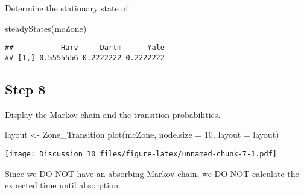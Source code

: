 \documentclass[
]{article}
\newenvironment{Shaded}{\begin{snugshade}}{\end{snugshade}}
\newcommand{\AttributeTok}[1]{\textcolor[rgb]{0.77,0.63,0.00}{#1}}
\newcommand{\DecValTok}[1]{\textcolor[rgb]{0.00,0.00,0.81}{#1}}
\newcommand{\FunctionTok}[1]{\textcolor[rgb]{0.00,0.00,0.00}{#1}}
\newcommand{\NormalTok}[1]{#1}
\newcommand{\OtherTok}[1]{\textcolor[rgb]{0.56,0.35,0.01}{#1}}
\begin{document}
Determine the stationary state of

\begin{Shaded}
\begin{Highlighting}[]
\FunctionTok{steadyStates}\NormalTok{(mcZone)}
\end{Highlighting}
\end{Shaded}

\begin{verbatim}
##           Harv     Dartm      Yale
## [1,] 0.5555556 0.2222222 0.2222222
\end{verbatim}

\hypertarget{step-8}{%
\subsection{Step 8}\label{step-8}}

Display the Markov chain and the transition probabilities.

\begin{Shaded}
\begin{Highlighting}[]
\NormalTok{layout }\OtherTok{\textless{}{-}}\NormalTok{ Zone\_Transition}
\FunctionTok{plot}\NormalTok{(mcZone, }\AttributeTok{node.size =} \DecValTok{10}\NormalTok{, }\AttributeTok{layout =}\NormalTok{ layout)}
\end{Highlighting}
\end{Shaded}

\texttt{[image: Discussion\_10\_files/figure-latex/unnamed-chunk-7-1.pdf]}

Since we DO NOT have an absorbing Markov chain, we DO NOT calculate the
expected time until absorption.
\end{document}
